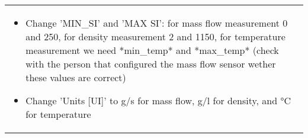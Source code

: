 \begin{tabularx}{\textwidth}{X}
{\begin{itemize}
      \item Change 'MIN\_SI' and 'MAX SI':
            for mass flow measurement 0 and 250,
            for density measurement 2 and 1150,
            for temperature measurement we need *min\_temp* and *max\_temp*
            (check with the person that configured the mass flow sensor wether these values are correct)

      \item Change 'Units [UI]' to g/s for mass flow, g/l for density, and °C for temperature
    \end{itemize}
  }
\end{tabularx}
